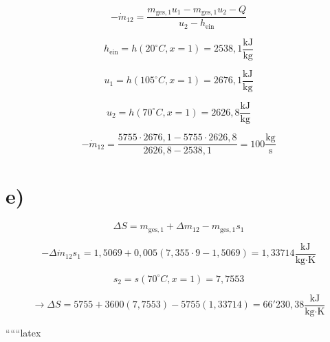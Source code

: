 \begin{equation*}
- \dot{m}_{12} = \frac{m_{\text{ges},1} u_1 - m_{\text{ges},1} u_2 - Q}{u_2 - h_{\text{ein}}}
\end{equation*}

\begin{equation*}
h_{\text{ein}} = h(20^\circ C, x=1) = 2538,1 \frac{\text{kJ}}{\text{kg}}
\end{equation*}

\begin{equation*}
u_1 = h(105^\circ C, x=1) = 2676,1 \frac{\text{kJ}}{\text{kg}}
\end{equation*}

\begin{equation*}
u_2 = h(70^\circ C, x=1) = 2626,8 \frac{\text{kJ}}{\text{kg}}
\end{equation*}

\begin{equation*}
- \dot{m}_{12} = \frac{5755 \cdot 2676,1 - 5755 \cdot 2626,8}{2626,8 - 2538,1} = 100 \frac{\text{kg}}{\text{s}}
\end{equation*}

\section*{e)}

\begin{equation*}
\Delta S = m_{\text{ges},1} + \Delta m_{12} - m_{\text{ges},1} s_1
\end{equation*}

\begin{equation*}
- \Delta \dot{m}_{12} s_1 = 1,5069 + 0,005 (7,355 \cdot 9 - 1,5069) = 1,33714 \frac{\text{kJ}}{\text{kg} \cdot \text{K}}
\end{equation*}

\begin{equation*}
s_2 = s(70^\circ C, x=1) = 7,7553
\end{equation*}

\begin{equation*}
\rightarrow \Delta S = 5755 + 3600 (7,7553) - 5755 (1,33714) = 66'230,38 \frac{\text{kJ}}{\text{kg} \cdot \text{K}}
\end{equation*}

``````latex


